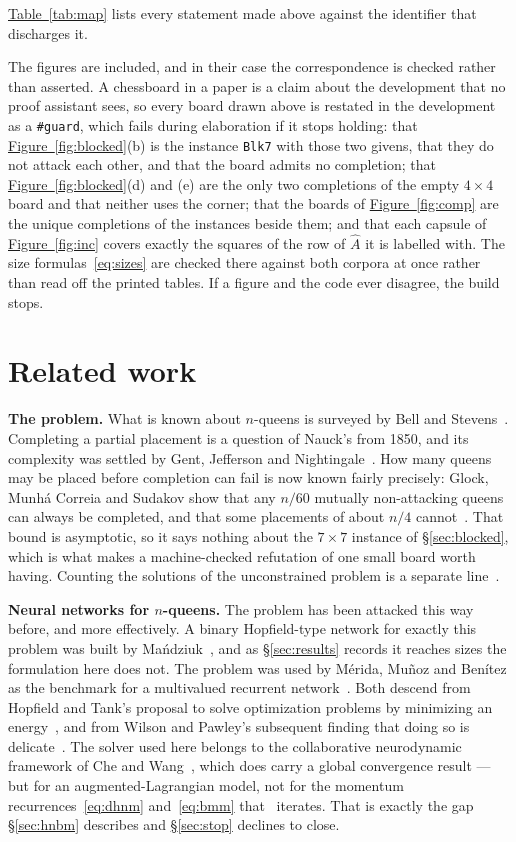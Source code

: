 \documentclass{easychair}
\newcommand{\secref}[1]{\hyperref[#1]{\textcolor{academicpurple}{\S\ref*{#1}}}}
\newcommand{\citeref}[1]{\textcolor{academicpurple}{\cite{#1}}}
\newcommand{\tabref}[1]{\textcolor{academicpurple}{\hyperref[#1]{Table~\ref*{#1}}}}
\newcommand{\figref}[1]{\textcolor{academicpurple}{\hyperref[#1]{Figure~\ref*{#1}}}}
\begin{document}
\tabref{tab:map} lists every statement made above against the identifier that discharges it.

The figures are included, and in their case the correspondence is checked rather than asserted. A
chessboard in a paper is a claim about the development that no proof assistant sees, so every board
drawn above is restated in the development as a \lstinline{#guard}, which fails during elaboration if
it stops holding: that \figref{fig:blocked}(b) is the instance \texttt{Blk7} with those two givens,
that they do not attack each other, and that the board admits no completion; that
\figref{fig:blocked}(d) and (e) are the only two completions of the empty $4\times4$ board and that
neither uses the corner; that the boards of \figref{fig:comp} are the unique completions of the
instances beside them; and that each capsule of \figref{fig:inc} covers exactly the squares of the row
of $\hat A$ it is labelled with. The size formulas~\eqref{eq:sizes} are checked there against both
corpora at once rather than read off the printed tables. If a figure and the code ever disagree, the
build stops.

\section{Related work}\label{sec:related}

\noindent\textbf{The problem.} What is known about $n$-queens is surveyed by Bell and
Stevens~\citeref{bell2009}. Completing a partial placement is a question of Nauck's from 1850, and its
complexity was settled by Gent, Jefferson and Nightingale~\citeref{gent2017}. How many queens may be
placed before completion can fail is now known fairly precisely: Glock, Munh\'{a} Correia and Sudakov
show that any $n/60$ mutually non-attacking queens can always be completed, and that some placements
of about $n/4$ cannot~\citeref{glock2022}. That bound is asymptotic, so it says nothing about the
$7\times7$ instance of \secref{sec:blocked}, which is what makes a machine-checked refutation of one
small board worth having. Counting the solutions of the unconstrained problem is a separate
line~\citeref{simkin2021}.

\medskip\noindent\textbf{Neural networks for $n$-queens.} The problem has been attacked this way
before, and more effectively. A binary Hopfield-type network for exactly this problem was built by
Ma\'{n}dziuk~\citeref{mandziuk1995}, and as \secref{sec:results} records it reaches sizes the
formulation here does not. The problem was used by M\'{e}rida, Mu\~{n}oz and Ben\'{i}tez as the benchmark
for a multivalued recurrent network~\citeref{merida2001}. Both descend from Hopfield and Tank's
proposal to solve optimization problems by minimizing an energy~\citeref{hopfieldtank1985}, and from
Wilson and Pawley's subsequent finding that doing so is delicate~\citeref{wilson1988}. The solver used
here belongs to the collaborative neurodynamic framework of Che and Wang~\citeref{che2019}, which does
carry a global convergence result --- but for an augmented-Lagrangian model, not for the momentum
recurrences~\eqref{eq:dhnm} and~\eqref{eq:bmm} that~\citeref{liwang2022} iterates. That is exactly the
gap \secref{sec:hnbm} describes and \secref{sec:stop} declines to close.
\end{document}
